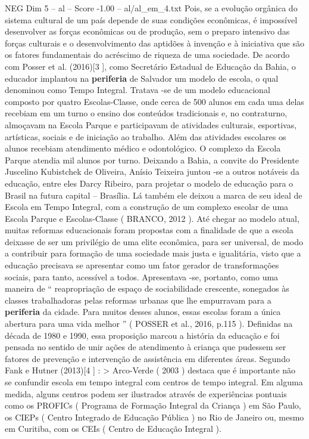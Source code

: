 \begin{textsample}{NEG Dim 5 – al – Score -1.00 – al/al\_em\_4.txt}
Pois, se a evolução orgânica do sistema cultural de um país depende de suas condições econômicas, é impossível desenvolver as forças econômicas ou de produção, sem o preparo intensivo das forças culturais e o desenvolvimento das aptidões à invenção e à iniciativa que são os fatores fundamentais do acréscimo de riqueza de uma sociedade.
De acordo com Posser et al. (2016)[3 ], como Secretário Estadual de Educação da Bahia, o educador implantou na \textbf{periferia} de Salvador um modelo de escola, o qual denominou como Tempo Integral.
Tratava -se de um modelo educacional composto por quatro Escolas-Classe, onde cerca de 500 alunos em cada uma delas recebiam em um turno o ensino dos conteúdos tradicionais e, no contraturno, almoçavam na Escola Parque e participavam de atividades culturais, esportivas, artísticas, sociais e de iniciação ao trabalho.
Além das atividades escolares os alunos recebiam atendimento médico e odontológico.
O complexo da Escola Parque atendia mil alunos por turno.
Deixando a Bahia, a convite do Presidente Juscelino Kubistchek de Oliveira, Anísio Teixeira juntou -se a outros notáveis da educação, entre eles Darcy Ribeiro, para projetar o modelo de educação para o Brasil na futura capital – Brasília.
Lá também ele deixou a marca de seu ideal de Escola em Tempo Integral, com a construção de um complexo escolar de uma Escola Parque e Escolas-Classe ( BRANCO, 2012 ).
Até chegar ao modelo atual, muitas reformas educacionais foram propostas com a finalidade de que a escola deixasse de ser um privilégio de uma elite econômica, para ser universal, de modo a contribuir para formação de uma sociedade mais justa e igualitária, visto que a educação precisava se apresentar como um fator gerador de transformações sociais, para tanto, acessível a todos.
Apresentava -se, portanto, como uma maneira de “ reapropriação de espaço de sociabilidade crescente, sonegados às classes trabalhadoras pelas reformas urbanas que lhe empurravam para a \textbf{periferia} da cidade.
Para muitos desses alunos, essas escolas foram a única abertura para uma vida melhor ” ( POSSER et al., 2016, p.115 ).
Definidas na década de 1980 e 1990, essa proposição marcou a história da educação e foi pensada no sentido de unir ações de atendimento à criança que pudessem ser fatores de prevenção e intervenção de assistência em diferentes áreas.
Segundo Fank e Hutner (2013)[4 ] : > Arco-Verde ( 2003 ) destaca que é importante não se confundir escola em tempo integral com centros de tempo integral.
Em alguma medida, alguns centros podem ser ilustrados através de experiências pontuais como os PROFICs ( Programa de Formação Integral da Criança ) em São Paulo, os CIEPs ( Centro Integrado de Educação Pública ) no Rio de Janeiro ou, mesmo em Curitiba, com os CEIs ( Centro de Educação Integral ).

\end{textsample}
